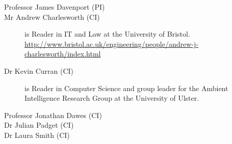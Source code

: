 \begin{description}
	\item[Professor James Davenport (PI)]
\ifandrew
	\item[Mr Andrew Charlesworth (CI)]is Reader in IT and Law at the University of Bristol. \url{http://www.bristol.ac.uk/engineering/people/andrew-j-charlesworth/index.html}
\fi
\ifulster
	\item[Dr Kevin Curran (CI)]is Reader in Computer Science and group leader for the Ambient Intelligence Research Group at the University of Ulster.
\fi
	\item[Professor Jonathan Dawes (CI)]
	\item[Dr Julian Padget (CI)]
\iflaura
	\item[Dr Laura Smith (CI)]
\fi
\end{description}

